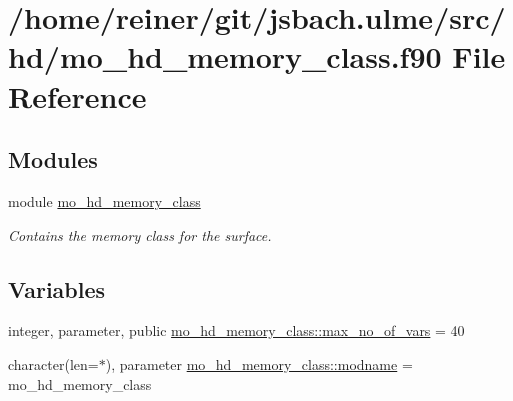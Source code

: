 \hypertarget{mo__hd__memory__class_8f90}{}\section{/home/reiner/git/jsbach.ulme/src/hd/mo\+\_\+hd\+\_\+memory\+\_\+class.f90 File Reference}
\label{mo__hd__memory__class_8f90}
\subsection*{Modules}
\begin{DoxyCompactItemize}
\item 
module \hyperlink{namespacemo__hd__memory__class}{mo\+\_\+hd\+\_\+memory\+\_\+class}
\begin{DoxyCompactList}\small\item\em Contains the memory class for the surface. \end{DoxyCompactList}\end{DoxyCompactItemize}
\subsection*{Variables}
\begin{DoxyCompactItemize}
\item 
integer, parameter, public \hyperlink{namespacemo__hd__memory__class_a43cccc371ea07cf14709f46aedbbed46}{mo\+\_\+hd\+\_\+memory\+\_\+class\+::max\+\_\+no\+\_\+of\+\_\+vars} = 40
\item 
character(len=$\ast$), parameter \hyperlink{namespacemo__hd__memory__class_afa4e8202a33ac7bbba47914da1153507}{mo\+\_\+hd\+\_\+memory\+\_\+class\+::modname} = \textquotesingle{}mo\+\_\+hd\+\_\+memory\+\_\+class\textquotesingle{}
\end{DoxyCompactItemize}
